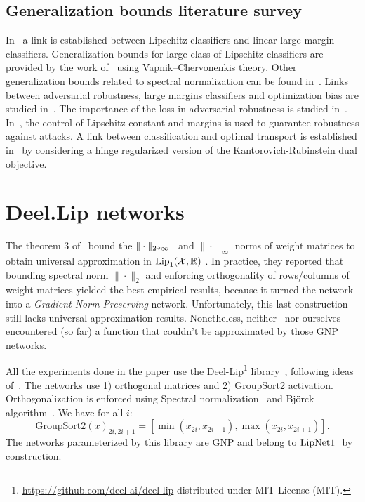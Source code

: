     \subsection{Generalization bounds literature survey}\label{app:generalizationbounds}

    In~\cite{von2004distance} a link is established between Lipschitz classifiers and linear large-margin classifiers. Generalization bounds for large class of Lipschitz classifiers are provided by the work of~\cite{gottlieb2014efficient} using Vapnik–Chervonenkis theory. Other generalization bounds related to spectral normalization can be found in~\cite{bartlett2017spectrally}. Links between adversarial robustness, large margins classifiers and optimization bias are studied in~\cite{faghri2021bridging,finlay2018lipschitz,jiang2018predicting}. The importance of the loss in adversarial robustness is studied in~\cite{pang2019rethinking}. In~\cite{NEURIPS2018_48584348}, the control of Lipschitz constant and margins is used to guarantee robustness against attacks. A link between classification and optimal transport is established in~\cite{serrurier2020achieving} by considering a hinge regularized version of the Kantorovich-Rubinstein dual objective.   

            
\section{Deel.Lip networks}\label{ap:deellip}

    The theorem 3 of~\cite{anil2019sorting} bound the $\|\cdot\|_{2\veryshortarrow\infty}$~\cite{cape2019two} and $\|\cdot\|_{\infty}$ norms of weight matrices to obtain universal approximation in $\text{Lip}_1(\mathcal{X},\mathbb{R})$ . In practice, they reported that bounding spectral norm $\|\cdot\|_2$ and enforcing orthogonality of rows/columns of weight matrices yielded the best empirical results, because it turned the network into a \textit{Gradient Norm Preserving} network. Unfortunately, this last construction still lacks universal approximation results. Nonetheless, neither~\cite{anil2019sorting} nor ourselves encountered (so far) a function that couldn't be approximated by those GNP networks.  
      
    All the experiments done in the paper use the Deel-Lip\footnote{\url{https://github.com/deel-ai/deel-lip} distributed under MIT License (MIT).} library~\cite{serrurier2020achieving}, following ideas of~\cite{anil2019sorting}. The networks use 1) orthogonal matrices and 2) GroupSort2 activation. Orthogonalization is enforced using Spectral normalization~\cite{miyato2018spectral} and Bj{\"o}rck algorithm~\cite{bjorck1971iterative}. We have for all $i$: $$\text{GroupSort2}(x)_{2i,2i+1}=[\min{(x_{2i},x_{2i+1})},\max{(x_{2i},x_{2i+1})}].$$
    The networks parameterized by this library are GNP and belong to $\text{LipNet1 }$ by construction.       
      
